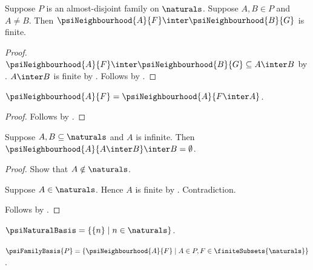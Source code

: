 \begin{corollary}\label{psi_neighbourhood_distinct_centers_finite_intersection}
    Suppose $P$ is an almost-disjoint family on
        $\naturals$.
    Suppose $A,B\in P$ and $A\neq B$.
    Then $\psiNeighbourhood{A}{F}\inter
        \psiNeighbourhood{B}{G}$ is finite.
\end{corollary}
\begin{proof}
    $\psiNeighbourhood{A}{F}\inter\psiNeighbourhood{B}{G}
        \subseteq A\inter B$
        by .
    $A\inter B$ is finite by
        .
    Follows by .
\end{proof}

\begin{proposition}\label{psi_neighbourhood_normalize_finite_set}
    $\psiNeighbourhood{A}{F}
        =\psiNeighbourhood{A}{F\inter A}$.
\end{proposition}
\begin{proof}
    Follows by
        .
\end{proof}

\begin{proposition}\label{psi_neighbourhood_avoids_natural_set}
    Suppose $A,B\subseteq\naturals$ and $A$ is infinite.
    Then $\psiNeighbourhood{A}{A\inter B}\inter B=\emptyset$.
\end{proposition}
\begin{proof}
    Show that $A\notin\naturals$.
    \begin{subproof}
        Suppose $A\in\naturals$.
        Hence $A$ is finite by .
        Contradiction.
    \end{subproof}
    Follows by
        .
\end{proof}

\begin{definition}\label{psi_natural_basis}
    $\psiNaturalBasis=\{\{n\}\mid n\in\naturals\}$.
\end{definition}

\begin{definition}\label{psi_family_basis}
    $\psiFamilyBasis{P}=\{\psiNeighbourhood{A}{F}
        \mid A\in P,F\in\finiteSubsets{\naturals}\}$.
\end{definition}

